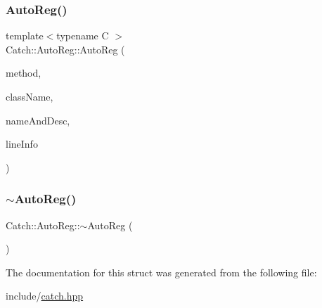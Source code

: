 \mbox{\label{struct_catch_1_1_auto_reg_a1bf9207fe0a02b46dc0ab1cc03cbe738}} 
\subsubsection{\texorpdfstring{Auto\+Reg()}{AutoReg()}\hspace{0.1cm}{\footnotesize\ttfamily [2/2]}}
{\footnotesize\ttfamily template$<$typename C $>$ \\
Catch\+::\+Auto\+Reg\+::\+Auto\+Reg (\begin{DoxyParamCaption}\item[{void(C\+::$\ast$)()}]{method,  }\item[{char const $\ast$}]{class\+Name,  }\item[{\mbox{\hyperlink{struct_catch_1_1_name_and_desc}{Name\+And\+Desc}} const \&}]{name\+And\+Desc,  }\item[{\mbox{\hyperlink{struct_catch_1_1_source_line_info}{Source\+Line\+Info}} const \&}]{line\+Info }\end{DoxyParamCaption})\hspace{0.3cm}{\ttfamily [inline]}}

\mbox{\label{struct_catch_1_1_auto_reg_a3cdb53f1e5ff115310f3372bebe198f1}} 
\subsubsection{\texorpdfstring{$\sim$\+Auto\+Reg()}{~AutoReg()}}
{\footnotesize\ttfamily Catch\+::\+Auto\+Reg\+::$\sim$\+Auto\+Reg (\begin{DoxyParamCaption}{ }\end{DoxyParamCaption})}



The documentation for this struct was generated from the following file\+:\begin{DoxyCompactItemize}
\item 
include/\mbox{\hyperlink{catch_8hpp}{catch.\+hpp}}\end{DoxyCompactItemize}
